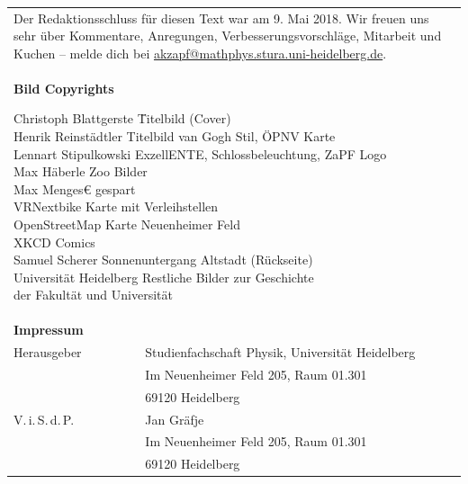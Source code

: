 \documentclass{scrbook}
\begin{document}
    \begin{tabular*}{\textwidth}{ll}
        \multicolumn{2}{l}{
            \parbox{\textwidth}{
                Der Redaktionsschluss für diesen Text war am 9. Mai 2018. Wir freuen uns
                sehr über Kommentare, Anregungen, Verbesserungsvorschläge,
                Mitarbeit und Kuchen -- melde dich bei
                \href{mailto:akzapf@mathphys.stura.uni-heidelberg.de}{akzapf@mathphys.stura.uni-heidelberg.de}.
            }
            \vspace{1cm}
        }\\
	\multicolumn{2}{l}{
	\parbox{0.77\textwidth}{
       	\textbf{Bild Copyrights}
       	\begin{tabbing}
		Christoph Blattgerste \quad \quad \=  Titelbild (Cover)\\		
		Henrik Reinstädtler\> Titelbild van Gogh Stil, ÖPNV Karte\\
		Lennart Stipulkowski \> ExzellENTE, Schlossbeleuchtung, ZaPF Logo\\
		Max Häberle \> Zoo Bilder\\
		Max Menges€ gespart \\		
		VRNextbike\footnotemark \> Karte mit Verleihstellen\\
		OpenStreetMap\footnotemark \> Karte Neuenheimer Feld\\
		XKCD\footnotemark \> Comics\\
		Samuel Scherer\footnotemark \> Sonnenuntergang Altstadt (Rückseite)\\
		Universität Heidelberg \> Restliche Bilder zur Geschichte\\
		\>der Fakultät und Universität\\
		

		\end{tabbing}
       	}
      }\\  

        \textbf{Impressum} &\\
        Herausgeber & Studienfachschaft Physik, Universität Heidelberg \\
        & Im Neuenheimer Feld 205, Raum 01.301\\
        & 69120 Heidelberg\\
        V.\,i.\,S.\,d.\,P. & Jan Gräfje\\
        & Im Neuenheimer Feld 205, Raum 01.301\\
        & 69120 Heidelberg\\
    \end{tabular*}
\end{document}
